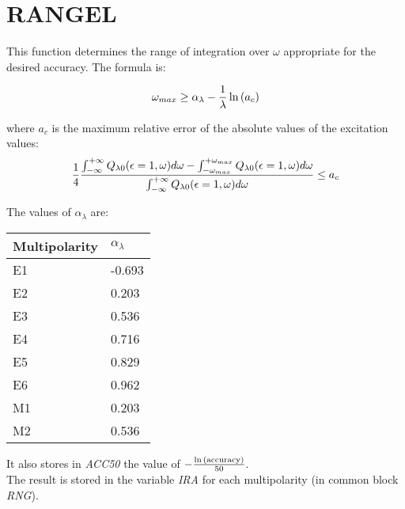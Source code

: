 \section{RANGEL}
\label{sect:rangel}

\noindent This function determines the range of integration over $\omega$
appropriate for the desired accuracy. The formula is:

\begin{equation}
\omega_{max} \ge \alpha_\lambda - {1 \over \lambda} \ln{(a_c)}
\end{equation}

\noindent where $a_c$ is the maximum relative error of the absolute values
of the excitation values:\\

\begin{equation}
{1 \over 4} {
\int_{-\infty}^{+\infty} Q_{\lambda 0}(\epsilon =1,\omega) d\omega
-
\int_{-\omega_{max}}^{+\omega_{max}} Q_{\lambda 0}(\epsilon =1,\omega) d\omega
\over
\int_{-\infty}^{+\infty} Q_{\lambda 0}(\epsilon =1,\omega) d\omega
}
\le
a_c
\end{equation}

\noindent The values of $\alpha_\lambda$ are:\\

\begin{center}
\begin{tabular}{|ll|}
\hline
Multipolarity & $\alpha_\lambda$\\
\hline
E1 & -0.693\\
E2 & 0.203\\
E3 & 0.536\\
E4 & 0.716\\
E5 & 0.829\\
E6 & 0.962\\
M1 & 0.203\\
M2 & 0.536\\
\hline
\end{tabular}
\end{center}

\noindent It also stores in {\em ACC50} the value of $-{\ln\mathrm{(accuracy)}
\over 50}$.\\

\noindent The result is stored in the variable {\em IRA} for each
multipolarity (in common block {\em RNG}).\\
